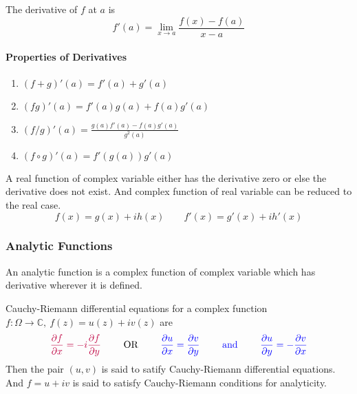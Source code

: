 \begin{definition}[derivative]
	The derivative of $f$ at $a$ is 
	\begin{equation}
		f'(a) = \lim_{x \to a} \frac{f(x)-f(a)}{x-a}
	\end{equation}
\end{definition}

\paragraph{Properties of Derivatives}
\begin{enumerate}
	\item $(f+g)'(a) = f'(a) + g'(a)$
	\item $(fg)'(a) = f'(a)g(a) + f(a)g'(a)$
	\item $(f/g)'(a) = \frac{g(a)f'(a)-f(a)g'(a)}{g^2(a)}$
	\item $(f \circ g)'(a) = f'(g(a)) g'(a)$
\end{enumerate}

\begin{important}
	A real function of complex variable either has the derivative zero or else the derivative does not exist.
	And complex function of real variable can be reduced to the real case.
	$$ f(x) = g(x)+ih(x) \qquad f'(x) = g'(x) +ih'(x) $$
\end{important}

\subsubsection{Analytic Functions}
\begin{definition}[analytic]
	An analytic function is a complex function of complex variable which has derivative wherever it is defined.
\end{definition}

\begin{definition}
	Cauchy-Riemann differential equations for a complex function $f : \Omega \to \mathbb{C},\ f(z) = u(z)+iv(z)$ are
\begin{equation}
	\textcolor{purple}{\frac{\partial f}{\partial x} = -i\frac{\partial f}{\partial y}}      \qquad \text{ OR }   \textcolor{blue}{\qquad \frac{\partial u}{\partial x} = \frac{\partial v}{\partial y} \qquad \text{ and } \qquad \frac{\partial u}{\partial y} = -\frac{\partial v}{\partial x}}
	\label{eqn:CR}
\end{equation}
	Then the pair $(u,v)$ is said to satify Cauchy-Riemann differential equations.
	And $f = u+iv$ is said to satisfy Cauchy-Riemann conditions for analyticity.
\end{definition}

